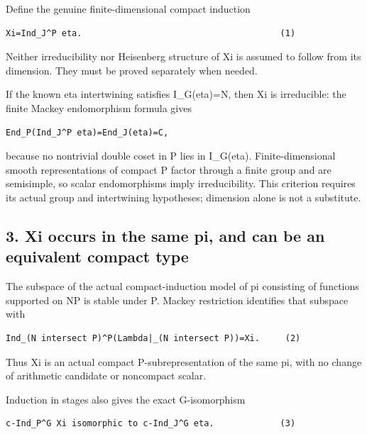 Define the genuine finite-dimensional compact induction

\begin{Verbatim}[fontsize=\small,breaklines=true,breakanywhere=true]
Xi=Ind_J^P eta.                                       (1)
\end{Verbatim}

Neither irreducibility nor Heisenberg structure of Xi is assumed to
follow from its dimension. They must be proved separately when needed.

If the known eta intertwining satisfies I\_G(eta)=N, then Xi is
irreducible: the finite Mackey endomorphism formula gives

\begin{Verbatim}[fontsize=\small,breaklines=true,breakanywhere=true]
End_P(Ind_J^P eta)=End_J(eta)=C,
\end{Verbatim}

because no nontrivial double coset in P lies in I\_G(eta).
Finite-dimensional smooth representations of compact P factor through a
finite group and are semisimple, so scalar endomorphisms imply
irreducibility. This criterion requires its actual group and
intertwining hypotheses; dimension alone is not a substitute.

\hypertarget{lowrank_contract-xi-occurs-in-the-same-pi-and-can-be-an-equivalent-compact-type}{%
\subsection{3. Xi occurs in the same pi, and can be an equivalent
compact
type}\label{lowrank_contract-xi-occurs-in-the-same-pi-and-can-be-an-equivalent-compact-type}}

The subspace of the actual compact-induction model of pi consisting of
functions supported on NP is stable under P. Mackey restriction
identifies that subspace with

\begin{Verbatim}[fontsize=\small,breaklines=true,breakanywhere=true]
Ind_(N intersect P)^P(Lambda|_(N intersect P))=Xi.     (2)
\end{Verbatim}

Thus Xi is an actual compact P-subrepresentation of the same pi, with no
change of arithmetic candidate or noncompact scalar.

Induction in stages also gives the exact G-isomorphism

\begin{Verbatim}[fontsize=\small,breaklines=true,breakanywhere=true]
c-Ind_P^G Xi isomorphic to c-Ind_J^G eta.             (3)
\end{Verbatim}


